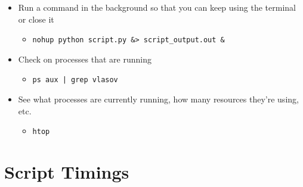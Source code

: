 \documentclass[11pt,a4paper]{report}
\begin{document}
\begin{itemize}

\item Run a command in the background so that you can keep using the terminal or close it
  \begin{itemize}
  \item \texttt{nohup python script.py \&> script\_output.out \&}
  \end{itemize}

\item Check on processes that are running
  \begin{itemize}
  \item \texttt{ps aux | grep vlasov}
  \end{itemize}

\item See what processes are currently running, how many resources they're using, etc.
  \begin{itemize}
  \item \texttt{htop}
  \end{itemize}

\end{itemize}


\section{Script Timings}
\label{sec:script-timings}
\end{document}
